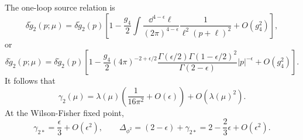 The one-loop source relation is
\[
  \delta\widetilde g_2(p;\mu)
  =
  \delta\widetilde g_2(p)
  \left[
    1
    -
    \frac{g_4}{2}
    \int
    \frac{\dd^{4-\epsilon}\ell}{(2\pi)^{4-\epsilon}}
    \frac{1}{\ell^2(p+\ell)^2}
    +
    O(g_4^2)
  \right],
\]
or
\[
  \delta\widetilde g_2(p;\mu)
  =
  \delta\widetilde g_2(p)
  \left[
    1
    -
    \frac{g_4}{2}
    (4\pi)^{-2+\epsilon/2}
    \frac{\Gamma(\epsilon/2)\Gamma(1-\epsilon/2)^2}{\Gamma(2-\epsilon)}
    |p|^{-\epsilon}
    +
    O(g_4^2)
  \right].
\]
It follows that
\[
  \gamma_2(\mu)
  =
  \lambda(\mu)
  \left(
    \frac{1}{16\pi^2}+O(\epsilon)
  \right)
  +
  O(\lambda(\mu)^2).
\]
At the Wilson-Fisher fixed point,
\[
  \gamma_{2*}
  =
  \frac{\epsilon}{3}+O(\epsilon^2),
  \qquad
  \Delta_{\phi^2}
  =
  (2-\epsilon)+\gamma_{2*}
  =
  2-\frac{2}{3}\epsilon+O(\epsilon^2).
\]


